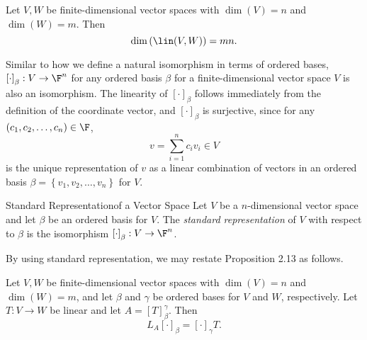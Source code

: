 \documentclass[linearalgebra]{subfiles}
\begin{document}
    \begin{cor}{}
        Let $V, W$ be finite-dimensional vector spaces with $\dim(V)=n$ and $\dim(W)=m$. Then
        \begin{equation*}
            \dim\left( \lin(V,W) \right) = mn.
        \end{equation*}
    \end{cor}	

    \begin{remark}
        Similar to how we define a natural isomorphism in terms of ordered bases, $\left[ \cdot \right] _\beta:V\to\F^n$ for any ordered basis $\beta$ for a finite-dimensional vector space $V$ is also an isomorphism. The linearity of $\left[ \cdot \right] _\beta$ follows immediately from the definition of the coordinate vector, and $\left[ \cdot \right] _\beta$ is surjective, since for any $\left( c_1,c_2,\ldots,c_n \right) \in\F$,
        \begin{equation*}
            v = \sum^{n}_{i=1} c_iv_i\in V
        \end{equation*}
        is the unique representation of $v$ as a linear combination of vectors in an ordered basis $\beta=\left\lbrace v_1,v_2,\ldots,v_n \right\rbrace$ for $V$.
    \end{remark}

    \begin{definition}{Standard Representation}{of a Vector Space}
        Let $V$ be a $n$-dimensional vector space and let $\beta$ be an ordered basis for $V$. The \emph{standard representation} of $V$ with respect to $\beta$ is the isomorphism $\left[ \cdot \right] _\beta:V\to\F^n$.
    \end{definition}

    \begin{remark}
        By using standard representation, we may restate Proposition 2.13 as follows.
    \end{remark}

    \begin{prop}{}
        Let $V, W$ be finite-dimensional vector spaces with $\dim(V)=n$ and $\dim(W)=m$, and let $\beta$ and $\gamma$ be ordered bases for $V$ and $W$, respectively. Let $T:V\to W$ be linear and let $A=\left[ T \right] ^\gamma_\beta$. Then
        \begin{equation*}
            L_A\left[ \cdot \right] _\beta = \left[ \cdot \right] _\gamma T.
        \end{equation*}
    \end{prop}
\end{document}
